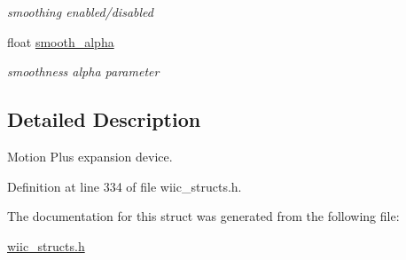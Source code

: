 \begin{DoxyCompactItemize}
\begin{DoxyCompactList}\small\item\em smoothing enabled/disabled \end{DoxyCompactList}\item 
\hypertarget{structmotion__plus__t_ab5eda5d43a79e927542d25338c3a7989}{float \hyperlink{structmotion__plus__t_ab5eda5d43a79e927542d25338c3a7989}{smooth\-\_\-alpha}}\label{structmotion__plus__t_ab5eda5d43a79e927542d25338c3a7989}

\begin{DoxyCompactList}\small\item\em smoothness alpha parameter \end{DoxyCompactList}\end{DoxyCompactItemize}


\subsection{\-Detailed \-Description}
\-Motion \-Plus expansion device. 

\-Definition at line 334 of file wiic\-\_\-structs.\-h.



\-The documentation for this struct was generated from the following file\-:\begin{DoxyCompactItemize}
\item 
\hyperlink{wiic__structs_8h}{wiic\-\_\-structs.\-h}\end{DoxyCompactItemize}
